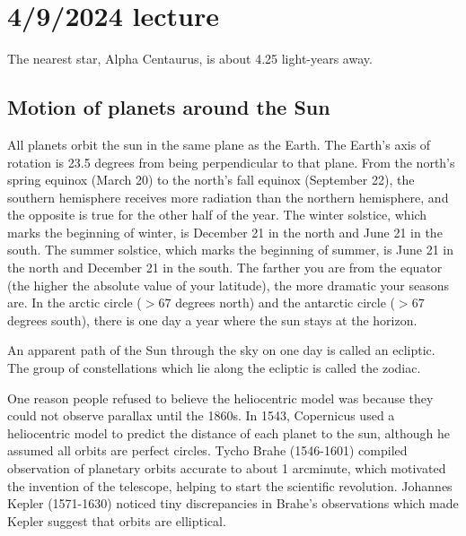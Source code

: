 \documentclass[class=article, crop=false]{standalone}
\begin{document}
\section{4/9/2024 lecture}
The nearest star, Alpha Centaurus, is about 4.25 light-years away.
\subsection{Motion of planets around the Sun}
All planets orbit the sun in the same plane as the Earth. The Earth's axis of rotation is 23.5 degrees from being perpendicular to that plane. From the north's spring equinox (March 20) to the north's fall equinox (September 22), the southern hemisphere receives more radiation than the northern hemisphere, and the opposite is true for the other half of the year. The winter solstice, which marks the beginning of winter, is December 21 in the north and June 21 in the south. The summer solstice, which marks the beginning of summer, is June 21 in the north and December 21 in the south. The farther you are from the equator (the higher the absolute value of your latitude), the more dramatic your seasons are. In the arctic circle ($>67$ degrees north) and the antarctic circle ($>67$ degrees south), there is one day a year where the sun stays at the horizon.
\par
An apparent path of the Sun through the sky on one day is called an ecliptic. The group of constellations which lie along the ecliptic is called the zodiac.\par
One reason people refused to believe the heliocentric model was because they could not observe parallax until the 1860s. In 1543, Copernicus used a heliocentric model to predict the distance of each planet to the sun, although he assumed all orbits are perfect circles. Tycho Brahe (1546-1601) compiled observation of planetary orbits accurate to about 1 arcminute, which motivated the invention of the telescope, helping to start the scientific revolution. Johannes Kepler (1571-1630) noticed tiny discrepancies in Brahe's observations which made Kepler suggest that orbits are elliptical.
\end{document}
